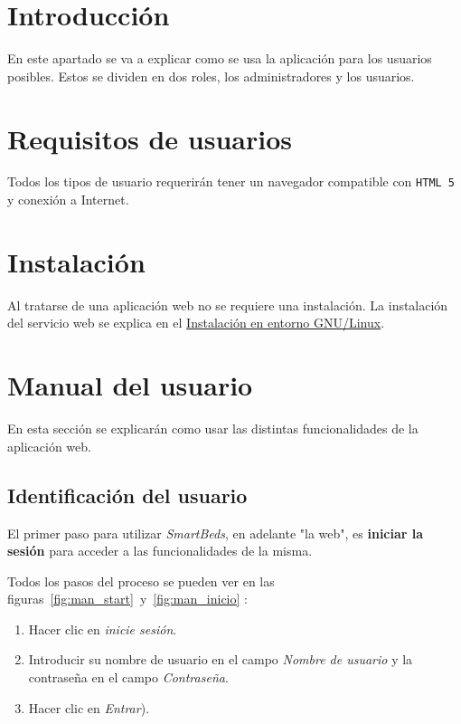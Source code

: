 
\section{Introducción}

En este apartado se va a explicar como se usa la aplicación para los usuarios posibles. Estos se dividen en dos roles, los administradores y los usuarios.

\section{Requisitos de usuarios}

Todos los tipos de usuario requerirán tener un navegador compatible con \texttt{HTML 5} y conexión a Internet.

\section{Instalación}

Al tratarse de una aplicación web no se requiere una instalación. La instalación del servicio web se explica en el \hyperref[sec:instalacion]{Instalación en entorno GNU/Linux}.

\section{Manual del usuario}

En esta sección se explicarán como usar las distintas funcionalidades de la aplicación web.

\subsection{Identificación del usuario}

El primer paso para utilizar \textit{SmartBeds}, en adelante "la web", es \textbf{iniciar la sesión} para acceder a las funcionalidades de la misma. 

Todos los pasos del proceso se pueden ver en las figuras~\ref{fig:man_start}~y~\ref{fig:man_inicio} :
\begin{enumerate}
	\item Hacer clic en \textit{inicie sesión}.
	\item Introducir su nombre de usuario en el campo \textit{Nombre de usuario} y la contraseña en el campo \textit{Contraseña}.
	\item Hacer clic en \textit{Entrar}).
\end{enumerate} 

